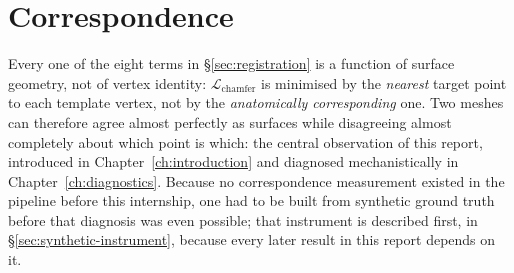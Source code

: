 \section{Correspondence}
\label{sec:correspondence-def}

Every one of the eight terms in \S\ref{sec:registration} is a function of
surface geometry, not of vertex identity: $\mathcal{L}_{\mathrm{chamfer}}$ is
minimised by the \emph{nearest} target point to each template vertex, not by
the \emph{anatomically corresponding} one. Two meshes can therefore agree
almost perfectly as surfaces while disagreeing almost completely about which
point is which: the central observation of this report, introduced in
Chapter~\ref{ch:introduction} and diagnosed mechanistically in
Chapter~\ref{ch:diagnostics}. Because no correspondence measurement existed
in the pipeline before this internship, one had to be built from synthetic
ground truth before that diagnosis was even possible; that instrument is
described first, in \S\ref{sec:synthetic-instrument}, because every later
result in this report depends on it.
